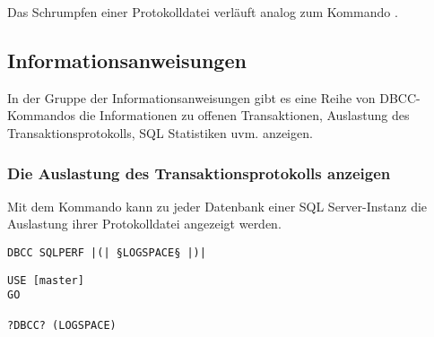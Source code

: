           Das Schrumpfen einer Protokolldatei verläuft analog zum Kommando
          .
          \begin{literaturinternet}
            \item \cite{ms190488}
            \item \cite{ms189493}
          \end{literaturinternet}
      \subsection{Informationsanweisungen}
        In der Gruppe der Informationsanweisungen gibt es eine Reihe von
        DBCC-Kommandos die Informationen zu offenen Transaktionen, Auslastung
        des Transaktionsprotokolls, SQL Statistiken uvm. anzeigen.
        \subsubsection{Die Auslastung des Transaktionsprotokolls anzeigen}
          Mit dem Kommando  kann zu jeder Datenbank einer
          SQL Server-Instanz die Auslastung ihrer Protokolldatei angezeigt
          werden.
          \begin{lstlisting}[language=ebnf, caption={Die Syntax zu
          SQLPERF}, label=admin03_35]
DBCC SQLPERF |(| §LOGSPACE§ |)|
          \end{lstlisting}
          \begin{lstlisting}[language=ms_sql,caption={Anzeigen
          der Protokolldateiauslastung},label=admin03_36]
USE [master]
GO

?DBCC? (LOGSPACE)
          \end{lstlisting}
\clearpage
